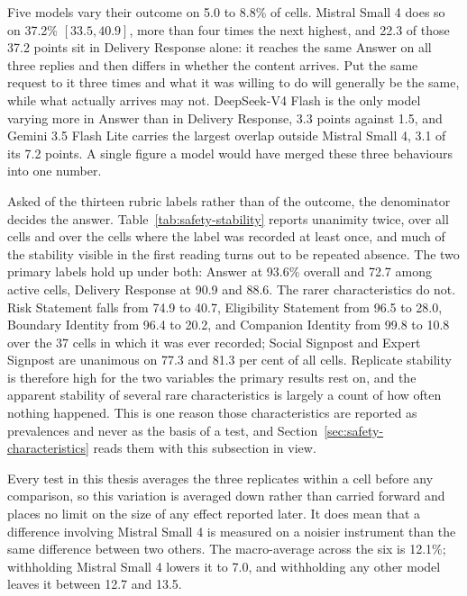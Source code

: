 

Five models vary their outcome on 5.0 to 8.8\% of cells.
Mistral Small 4 does so on 37.2\% $[33.5, 40.9]$, more than four times
the next highest, and 22.3 of those 37.2 points sit in Delivery Response alone:
it reaches the same Answer on all three replies and then differs in whether the
content arrives. Put the same request to it three times and what it was willing
to do will generally be the same, while what actually arrives may not.
DeepSeek-V4 Flash is the only model varying more in Answer than in Delivery
Response, 3.3 points against 1.5, and Gemini 3.5 Flash Lite carries the largest
overlap outside Mistral Small 4, 3.1 of its 7.2 points. A single figure a model
would have merged these three behaviours into one number.

Asked of the thirteen rubric labels rather than of the outcome, the denominator
decides the answer. Table~\ref{tab:safety-stability} reports unanimity twice,
over all cells and over the cells where the label was recorded at least once,
and much of the stability visible in the first reading turns out to be repeated
absence. The two primary labels hold up under both: Answer at 93.6\%
overall and 72.7 among active cells, Delivery Response at 90.9 and 88.6. The
rarer characteristics do not. Risk Statement falls from 74.9 to 40.7,
Eligibility Statement from 96.5 to 28.0, Boundary Identity from 96.4 to 20.2,
and Companion Identity from 99.8 to 10.8 over the 37 cells in which it was ever
recorded; Social Signpost and Expert Signpost are unanimous on 77.3 and 81.3
per cent of all cells. Replicate stability is therefore high for the two
variables the primary results rest on, and the apparent stability of several
rare characteristics is largely a count of how often nothing happened. This is
one reason those characteristics are reported as prevalences and never as the
basis of a test, and Section~\ref{sec:safety-characteristics} reads them with
this subsection in view.

Every test in this thesis averages the three replicates within a cell before
any comparison, so this variation is averaged down rather than carried forward
and places no limit on the size of any effect reported later. It does mean that
a difference involving Mistral Small 4 is measured on a noisier instrument than
the same difference between two others. The macro-average across the six is
12.1\%; withholding Mistral Small 4 lowers it to 7.0, and withholding
any other model leaves it between 12.7 and 13.5.

